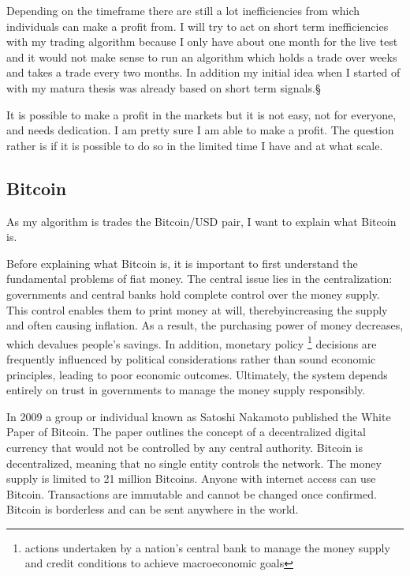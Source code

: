 \documentclass[12pt]{article}
\begin{document}
Depending on the timeframe there are still a lot inefficiencies from which individuals can make a profit from. I will try to act on short term inefficiencies with my trading algorithm because I only have about one month for the live test and it would not make sense to run an algorithm which holds a trade over weeks and takes a trade every two months. In addition my initial idea when I started of with my matura thesis was already based on short term signals.§

It is possible to make a profit in the markets but it is not easy, not for everyone, and needs dedication. I am pretty sure I am able to make a profit. The question rather is if it is possible to do so in the limited time I have and at what scale.





\newpage
\subsection*{Bitcoin}

As my algorithm is trades the Bitcoin/USD pair, I want to explain what Bitcoin is.

Before explaining what Bitcoin is, it is important to first understand the fundamental problems of fiat money. 
The central issue lies in the centralization: governments and central banks hold complete control over the money supply. This control enables them to print money at will, therebyincreasing the supply and often causing inflation. As a result, the purchasing power of money decreases, which devalues people’s savings. In addition, monetary policy \footnote[1]{actions undertaken by a nation's central bank to manage the money supply and credit conditions to achieve macroeconomic goals} 
decisions are frequently influenced by political considerations rather than sound economic principles, leading to poor economic outcomes. Ultimately, the system depends entirely on trust in governments to manage the money supply responsibly.


In 2009 a group or individual known as Satoshi Nakamoto published the White Paper of Bitcoin. The paper outlines the concept of a decentralized digital currency that would not be controlled by any central authority. Bitcoin is decentralized, meaning that no single entity controls the network. The money supply is limited to 21 million Bitcoins. Anyone with internet access can use Bitcoin. Transactions are immutable and cannot be changed once confirmed. Bitcoin is borderless and can be sent anywhere in the world.
\end{document}
